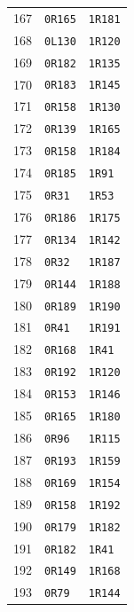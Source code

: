 \begin{longtable}{rll}
167 & \texttt{0R165} & \texttt{1R181}\\
168 & \texttt{0L130} & \texttt{1R120}\\
169 & \texttt{0R182} & \texttt{1R135}\\
170 & \texttt{0R183} & \texttt{1R145}\\
171 & \texttt{0R158} & \texttt{1R130}\\
172 & \texttt{0R139} & \texttt{1R165}\\
173 & \texttt{0R158} & \texttt{1R184}\\
174 & \texttt{0R185} & \texttt{1R91}\\
175 & \texttt{0R31} & \texttt{1R53}\\
176 & \texttt{0R186} & \texttt{1R175}\\
177 & \texttt{0R134} & \texttt{1R142}\\
178 & \texttt{0R32} & \texttt{1R187}\\
179 & \texttt{0R144} & \texttt{1R188}\\
180 & \texttt{0R189} & \texttt{1R190}\\
181 & \texttt{0R41} & \texttt{1R191}\\
182 & \texttt{0R168} & \texttt{1R41}\\
183 & \texttt{0R192} & \texttt{1R120}\\
184 & \texttt{0R153} & \texttt{1R146}\\
185 & \texttt{0R165} & \texttt{1R180}\\
186 & \texttt{0R96} & \texttt{1R115}\\
187 & \texttt{0R193} & \texttt{1R159}\\
188 & \texttt{0R169} & \texttt{1R154}\\
189 & \texttt{0R158} & \texttt{1R192}\\
190 & \texttt{0R179} & \texttt{1R182}\\
191 & \texttt{0R182} & \texttt{1R41}\\
192 & \texttt{0R149} & \texttt{1R168}\\
193 & \texttt{0R79} & \texttt{1R144}\\
\bottomrule
\end{longtable}
